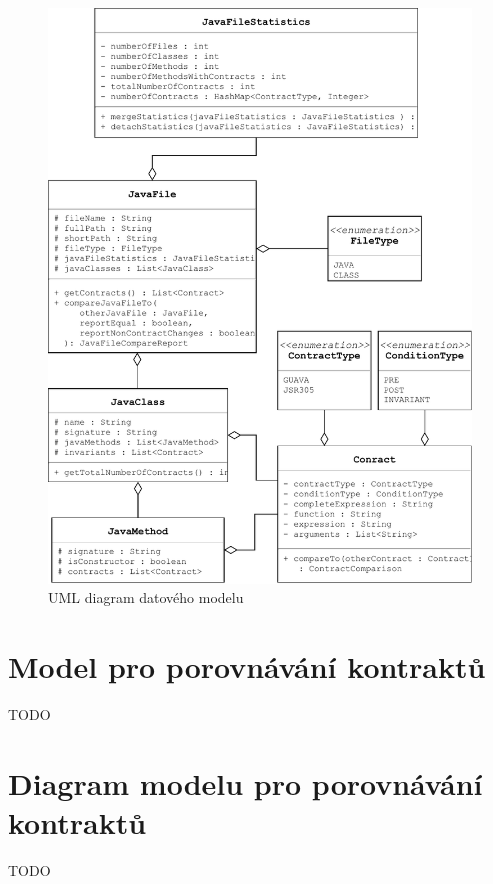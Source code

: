 				\begin{figure}[!htb]
						\centering
						\includegraphics[width=1\textwidth]{img/modelExtractorDiagram.pdf}
						\caption[modelExtractorDiagram]{UML diagram datového modelu}
						\label{modelExtractorDiagram}
					\endminipage\hfill
				\end{figure}


	\section{Model pro porovnávání kontraktů}
		TODO
	
	\section{Diagram modelu pro porovnávání kontraktů}
		TODO

			
